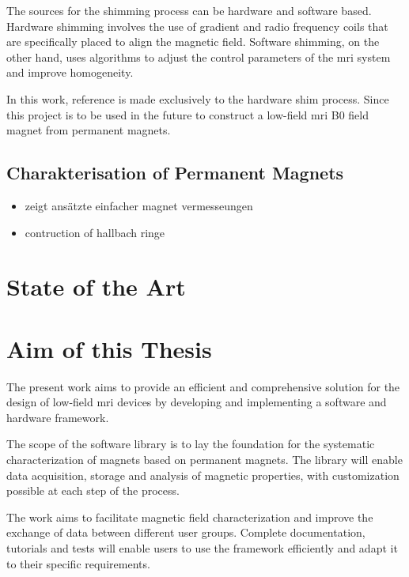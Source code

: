 The sources for the shimming process can be hardware and software based.
Hardware shimming involves the use of gradient and radio frequency coils
that are specifically placed to align the magnetic field. Software
shimming, on the other hand, uses algorithms to adjust the control
parameters of the \gls{mri} system and improve
homogeneity.\cite{10.3389/fphy.2021.704566}

In this work, reference is made exclusively to the hardware shim
process. Since this project is to be used in the future to construct a
low-field \gls{mri} B0 field magnet from permanent magnets.

\hypertarget{charakterisation-of-permanent-magnets}{%
\subsection{Charakterisation of Permanent
Magnets}\label{charakterisation-of-permanent-magnets}}

\begin{itemize}
\item
  zeigt ansätzte einfacher magnet vermesseungen
  \cite{Wickenbrock_2021}
\item
  contruction of hallbach ringe \cite{cmr.a.20165}
\end{itemize}

\hypertarget{state-of-the-art}{%
\section{State of the Art}\label{state-of-the-art}}

\hypertarget{aim-of-this-thesis}{%
\section{Aim of this Thesis}\label{aim-of-this-thesis}}

The present work aims to provide an efficient and comprehensive solution
for the design of low-field \gls{mri} devices by developing and
implementing a software and hardware framework.

The scope of the software library is to lay the foundation for the
systematic characterization of magnets based on permanent magnets. The
library will enable data acquisition, storage and analysis of magnetic
properties, with customization possible at each step of the process.

The work aims to facilitate magnetic field characterization and improve
the exchange of data between different user groups. Complete
documentation, tutorials and tests will enable users to use the
framework efficiently and adapt it to their specific requirements.

